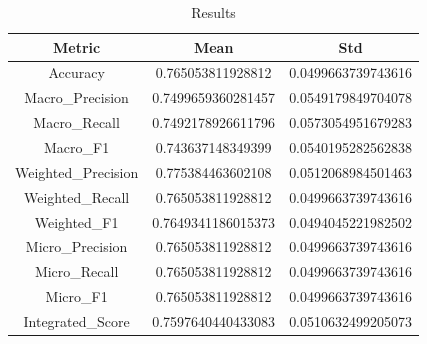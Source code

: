 \begin{table}[htbp]
\centering
\caption{Results}
\label{tab:csv}
\small
\setlength{\tabcolsep}{4pt}
\begin{tabular}{|c|c|c|}
\hline
Metric & Mean & Std \\
\hline
Accuracy & 0.765053811928812 & 0.0499663739743616 \\
Macro_Precision & 0.7499659360281457 & 0.0549179849704078 \\
Macro_Recall & 0.7492178926611796 & 0.0573054951679283 \\
Macro_F1 & 0.743637148349399 & 0.0540195282562838 \\
Weighted_Precision & 0.775384463602108 & 0.0512068984501463 \\
Weighted_Recall & 0.765053811928812 & 0.0499663739743616 \\
Weighted_F1 & 0.7649341186015373 & 0.0494045221982502 \\
Micro_Precision & 0.765053811928812 & 0.0499663739743616 \\
Micro_Recall & 0.765053811928812 & 0.0499663739743616 \\
Micro_F1 & 0.765053811928812 & 0.0499663739743616 \\
Integrated_Score & 0.7597640440433083 & 0.0510632499205073 \\
\hline
\end{tabular}
\end{table}